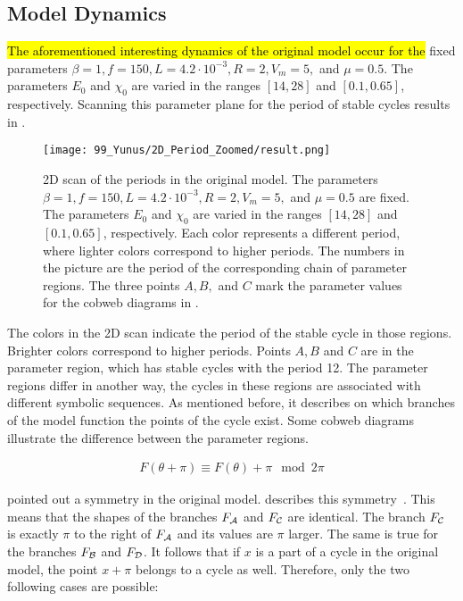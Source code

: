 \subsection{Model Dynamics}
\label{sec:state.og.dynamics}

\hl{The aforementioned interesting dynamics of the original model occur for the} fixed parameters $\beta = 1, f = 150, L = 4.2 \cdot 10^{-3}, R = 2, V_m = 5,$ and $\mu = 0.5$.
The parameters $E_0$ and $\chi_0$ are varied in the ranges $[14, 28]$ and $[0.1, 0.65]$, respectively.
Scanning this parameter plane for the period of stable cycles results in .

\begin{figure}
	\centering
	\texttt{[image: 99\_Yunus/2D\_Period\_Zoomed/result.png]}
	\caption[2D scan of the periods in the original model]{
		2D scan of the periods in the original model.
		The parameters $\beta = 1, f = 150, L = 4.2 \cdot 10^{-3}, R = 2, V_m = 5,$ and $\mu = 0.5$ are fixed.
		The parameters $E_0$ and $\chi_0$ are varied in the ranges $[14, 28]$ and $[0.1, 0.65]$, respectively.
		Each color represents a different period, where lighter colors correspond to higher periods.
		The numbers in the picture are the period of the corresponding chain of parameter regions.
		The three points $A, B,$ and $C$ mark the parameter values for the cobweb diagrams in .
	}
	\label{fig:state.og.dynamics.period}
\end{figure}

The colors in the 2D scan  indicate the period of the stable cycle in those regions.
Brighter colors correspond to higher periods.
Points $A, B$ and $C$ are in the parameter region, which has stable cycles with the period 12.
The parameter regions differ in another way, the cycles in these regions are associated with different symbolic sequences.
As mentioned before, it describes on which branches of the model function the points of the cycle exist.
Some cobweb diagrams illustrate the difference between the parameter regions.

\begin{align}
	F(\theta + \pi) \equiv F(\theta) + \pi \mod 2\pi \label{equ:state.og.sym}
\end{align}

 pointed out a symmetry in the original model.
 describes this symmetry~\cite{akyuz2022}.
This means that the shapes of the branches $F_{\mathcal{A}}$ and $F_{\mathcal{C}}$ are identical.
The branch $F_{\mathcal{C}}$ is exactly $\pi$ to the right of $F_{\mathcal{A}}$ and its values are $\pi$ larger.
The same is true for the branches $F_{\mathcal{B}}$ and $F_{\mathcal{D}}$.
It follows that if $x$ is a part of a cycle in the original model, the point $x + \pi$ belongs to a cycle as well.
Therefore, only the two following cases are possible:

